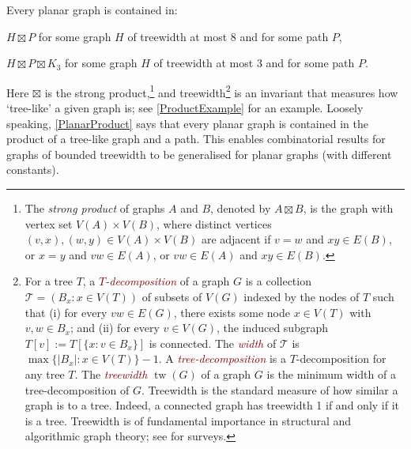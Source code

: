\documentclass{patmorin}
\newcommand{\defin}[1]{\textcolor{Maroon}{\emph{#1}}}
\newcommand{\note}[2]{\noindent{\color{red}[#1:~#2]}}
\DeclareMathOperator{\tw}{tw}
\begin{document}
\begin{thm}
	\label{PlanarProduct}
	Every planar graph is contained in: 
	\begin{compactenum}[(a)]
		\item $H\boxtimes P$ for some graph $H$ of treewidth at most $8$ and for some path $P$,
		\item $H\boxtimes P \boxtimes K_3$ for some graph $H$ of treewidth at most $3$ and for some path $P$.
	\end{compactenum}
\end{thm}


 \note{DW}{replace $8$ by $6$ and update elsewhere}

Here $\boxtimes$ is the strong product,\!\footnote{The \emph{strong product} of graphs $A$ and $B$, denoted by $A\boxtimes B$, is the graph with vertex set $V(A)\times V(B)$, where distinct vertices $(v,x),(w,y)\in V(A)\times V(B)$ are adjacent if
	$v=w$ and $xy\in E(B)$, or
	$x=y$ and $vw\in E(A)$, or
	$vw\in E(A)$ and $xy\in E(B)$.}
and treewidth\footnote{For a tree $T$, a \defin{$T$-decomposition} of a graph $G$ is a collection $\mathcal{T}=(B_x:x\in V(T))$ of subsets of $V(G)$ indexed by the nodes of $T$ such that
(i) for every $vw\in E(G)$, there exists some node $x\in V(T)$ with $v,w\in B_x$; and
(ii) for every $v\in V(G)$, the induced subgraph $T[v] := T[\{x: v\in B_x\}]$ is connected. The \defin{width} of $\mathcal{T}$ is $\max\{|B_x|:x\in V(T)\}-1$.  A \defin{tree-decomposition} is a $T$-decomposition for any tree $T$. The \defin{treewidth} $\tw(G)$ of a graph $G$ is the minimum width of a tree-decomposition of $G$.  Treewidth is the standard measure of how similar a graph is to a tree. Indeed, a connected graph has treewidth 1 if and only if it is a tree. Treewidth is of fundamental importance in structural and algorithmic graph theory; see \citep{Reed03,HW17,Bodlaender-TCS98} for surveys.} is an invariant that measures how `tree-like' a given graph is; see \cref{ProductExample} for an example. Loosely speaking, \cref{PlanarProduct} says that every planar graph is contained in the product of a tree-like graph and a path. This enables combinatorial results for graphs of bounded treewidth to be generalised for planar graphs (with different constants).
\end{document}
